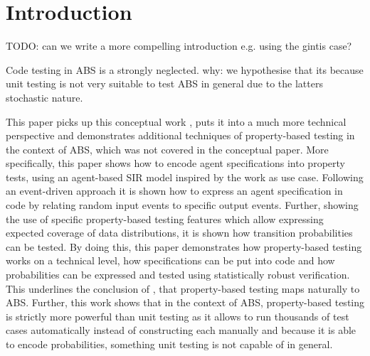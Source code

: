 \section{Introduction}
\label{sec:introduction}
TODO: can we write a more compelling introduction e.g. using the gintis case?

Code testing in ABS is a strongly neglected. why: we hypothesise that its because unit testing is not very suitable to test ABS in general due to the latters stochastic nature.


This paper picks up this conceptual work \cite{thaler_show_2019}, puts it into a much more technical perspective and demonstrates additional techniques of property-based testing in the context of ABS, which was not covered in the conceptual paper. More specifically, this paper shows how to encode agent specifications into property tests, using an agent-based SIR model inspired by the work \cite{macal_agent-based_2010} as use case. Following an event-driven approach it is shown how to express an agent specification in code by relating random input events to specific output events. Further, showing the use of specific property-based testing features which allow expressing expected coverage of data distributions, it is shown how transition probabilities can be tested. By doing this, this paper demonstrates how property-based testing works on a technical level, how specifications can be put into code and how probabilities can be expressed and tested using statistically robust verification. This underlines the conclusion of \cite{thaler_show_2019}, that property-based testing maps naturally to ABS. Further, this work shows that in the context of ABS, property-based testing is strictly more powerful than unit testing as it allows to run thousands of test cases automatically instead of constructing each manually and because it is able to encode probabilities, something unit testing is not capable of in general.

